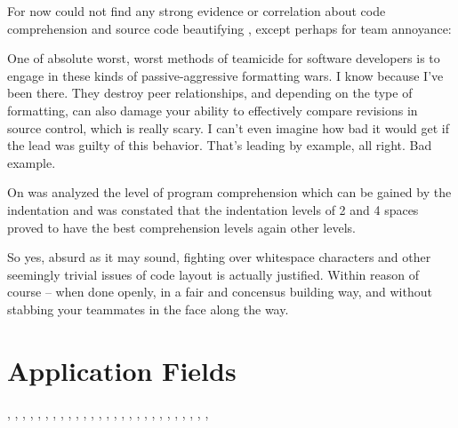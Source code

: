     For now could not find any strong evidence or correlation about code
    comprehension and source code beautifying \cite{improvingCodeReadability},
    except perhaps for team annoyance:

    \begin{citacao}
    One of absolute worst, worst methods of teamicide for software developers is to engage
    in these kinds of passive-aggressive formatting wars. I know because I've been there.
    They destroy peer relationships, and depending on the type of formatting, can also damage
    your ability to effectively compare revisions in source control, which is really scary.
    I can't even imagine how bad it would get if the lead was guilty of this behavior. That's
    leading by example, all right. Bad example. \cite{Atwood}
    \end{citacao}

    On  was analyzed the level of program
    comprehension which can be gained by the indentation and was constated that
    the indentation levels of 2 and 4 spaces proved to have the best
    comprehension levels again other levels.

    \begin{citacao}
    So yes, absurd as it may sound, fighting over whitespace characters and other seemingly
    trivial issues of code layout is actually justified. Within reason of course -- when done
    openly, in a fair and concensus building way, and without stabbing your teammates in the
    face along the way. \cite{Atwood}
    \end{citacao}



    \section{Application Fields}

    ,
    ,
    ,
    ,
    ,
    ,
    ,
    ,
    ,
    ,
    ,
    ,
    ,
    ,
    ,
    ,
    ,
    ,
    ,
    ,
    ,
    ,
    ,
    ,
    ,
    ,
    ,


